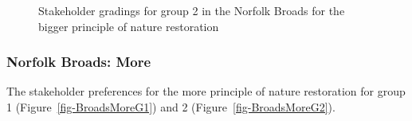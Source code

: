 \documentclass[
  12pt,
  letterpaper,
  DIV=11,
  numbers=noendperiod]{scrartcl}
\begin{document}
\begin{figure}[H]


\caption{\label{fig-BroadsBigG2}Stakeholder gradings for group 2 in the
Norfolk Broads for the bigger principle of nature restoration}

\end{figure}%

\newpage{}

\subsubsection{Norfolk Broads: More}\label{norfolk-broads-more}

The stakeholder preferences for the more principle of nature restoration
for group 1 (Figure~\ref{fig-BroadsMoreG1}) and 2
(Figure~\ref{fig-BroadsMoreG2}).
\end{document}
